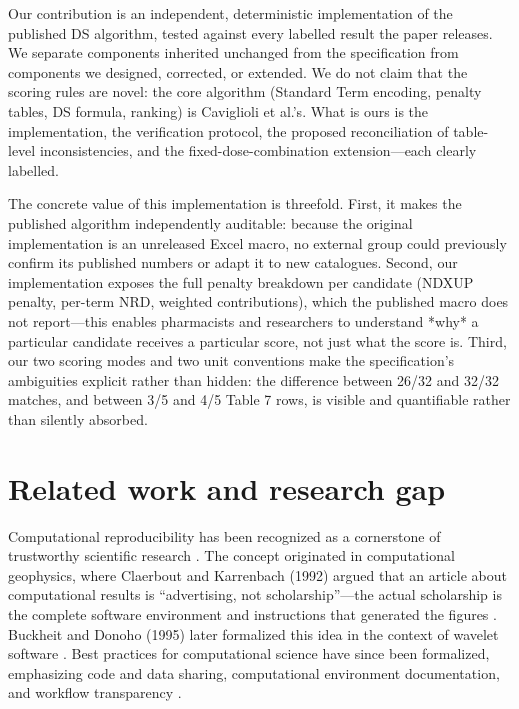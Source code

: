 \documentclass[12pt,twocolumn,a4paper]{elsarticle}
\begin{document}
Our contribution is an independent, deterministic implementation of the published DS algorithm, tested against every labelled result the paper releases. We separate components inherited unchanged from the specification from components we designed, corrected, or extended. We do not claim that the scoring rules are novel: the core algorithm (Standard Term encoding, penalty tables, DS formula, ranking) is Caviglioli et al.'s. What is ours is the implementation, the verification protocol, the proposed reconciliation of table-level inconsistencies, and the fixed-dose-combination extension---each clearly labelled.

The concrete value of this implementation is threefold. First, it makes the published algorithm independently auditable: because the original implementation is an unreleased Excel macro, no external group could previously confirm its published numbers or adapt it to new catalogues. Second, our implementation exposes the full penalty breakdown per candidate (NDXUP penalty, per-term NRD, weighted contributions), which the published macro does not report---this enables pharmacists and researchers to understand *why* a particular candidate receives a particular score, not just what the score is. Third, our two scoring modes and two unit conventions make the specification's ambiguities explicit rather than hidden: the difference between 26/32 and 32/32 matches, and between 3/5 and 4/5 Table 7 rows, is visible and quantifiable rather than silently absorbed.

\section{Related work and research gap}
\label{sec:related}

Computational reproducibility has been recognized as a cornerstone of trustworthy scientific research \citep{nationalacademies2019reproducibility,peng2011reproducible,peng2006reproducible}. The concept originated in computational geophysics, where Claerbout and Karrenbach (1992) argued that an article about computational results is ``advertising, not scholarship''---the actual scholarship is the complete software environment and instructions that generated the figures \citep{claerbout1992electronic}. Buckheit and Donoho (1995) later formalized this idea in the context of wavelet software \citep{buckheit1995wavelab}. Best practices for computational science have since been formalized, emphasizing code and data sharing, computational environment documentation, and workflow transparency \citep{stodden2014reproducible,stodden2014best,wilson2014best,taschuk2017ten,wilson2017good}.
\end{document}

